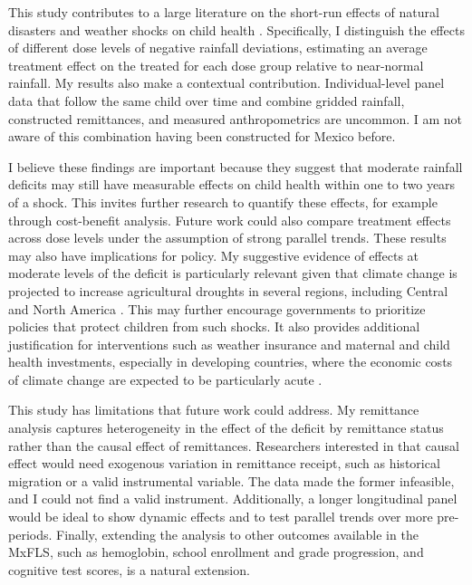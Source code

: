 \documentclass[12pt]{article}
\begin{document}
This study contributes to a large literature on the short-run effects of natural disasters and weather shocks on child health \parencite{datarImpactNaturalDisasters2013,hirvonenImpactEthiopias20152020,dodlovaEffects2010Haiti2023}. Specifically, I distinguish the effects of different dose levels of negative rainfall deviations, estimating an average treatment effect on the treated for each dose group relative to near-normal rainfall. My results also make a contextual contribution. Individual-level panel data that follow the same child over time and combine gridded rainfall, constructed remittances, and measured anthropometrics are uncommon. I am not aware of this combination having been constructed for Mexico before.

I believe these findings are important because they suggest that moderate rainfall deficits may still have measurable effects on child health within one to two years of a shock. This invites further research to quantify these effects, for example through cost-benefit analysis. Future work could also compare treatment effects across dose levels under the assumption of strong parallel trends. These results may also have implications for policy. My suggestive evidence of effects at moderate levels of the deficit is particularly relevant given that climate change is projected to increase agricultural droughts in several regions, including Central and North America \parencite{ipccSummaryPolicymakers2021}. This may further encourage governments to prioritize policies that protect children from such shocks. It also provides additional justification for interventions such as weather insurance and maternal and child health investments, especially in developing countries, where the economic costs of climate change are expected to be particularly acute \parencite{jessoeClimateChangeLabour2018}.

This study has limitations that future work could address. My remittance analysis captures heterogeneity in the effect of the deficit by remittance status rather than the causal effect of remittances. Researchers interested in that causal effect would need exogenous variation in remittance receipt, such as historical migration or a valid instrumental variable. The data made the former infeasible, and I could not find a valid instrument. Additionally, a longer longitudinal panel would be ideal to show dynamic effects and to test parallel trends over more pre-periods. Finally, extending the analysis to other outcomes available in the MxFLS, such as hemoglobin, school enrollment and grade progression, and cognitive test scores, is a natural extension.
\end{document}
